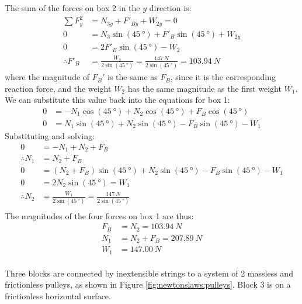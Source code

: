 \begin{solution}
The sum of the forces on box 2 in the $y$ direction is:
\begin{align*}
\sum F_y^2 &= N_{3y}+F'_{By}+W_{2y} = 0\\
0&= N_3\sin(\SI{45}{\degree})+F'_B\sin(\SI{45}{\degree})+W_{2y}\\
0&= 2F'_B\sin(\SI{45}{\degree})-W_2\\
\therefore F'_B&=\frac{W_2}{2\sin(\SI{45}{\degree})}=\frac{\SI{147}{N}}{2\sin(\SI{45}{\degree})}=\SI{103.94}{N}
\end{align*}
where the magnitude of $F_B'$ is the same as $F_B$, since it is the corresponding reaction force, and the weight $W_2$ has the same magnitude as the first weight $W_1$. We can substitute this value back into the equations for box 1:
\begin{align*}
0&= -N_1\cos(\SI{45}{\degree})+N_2\cos(\SI{45}{\degree})+F_B\cos(\SI{45}{\degree}) \\
0&= N_1\sin(\SI{45}{\degree})+N_2\sin(\SI{45}{\degree})-F_B\sin(\SI{45}{\degree})-W_1
\end{align*}
Substituting and solving:
\begin{align*}
0&= -N_1+N_2+F_B \\
\therefore N_1&=N_2+F_B\\
0 &=(N_2+F_B)\sin(\SI{45}{\degree})+N_2\sin(\SI{45}{\degree})-F_B\sin(\SI{45}{\degree})-W_1\\
0 &= 2N_2\sin(\SI{45}{\degree})=W_1\\
\therefore N_2 &= \frac{W_1}{2\sin(\SI{45}{\degree})}=\frac{\SI{147}{N}}{2\sin(\SI{45}{\degree})}\\
\end{align*}
The magnitudes of the four forces on box 1 are thus:
\begin{align*}
F_B&=N_2=\SI{103.94}{N}\\
N_1&=N_2+F_B=\SI{207.89}{N}\\
W_1&=\SI{147.00}{N}\\
\end{align*}

\end{solution}

\question Three blocks are connected by inextensible strings to a system of 2 massless and frictionless pulleys, as shown in Figure \ref{fig:newtonslaws:pulleys}. Block 3 is on a frictionless horizontal surface.

